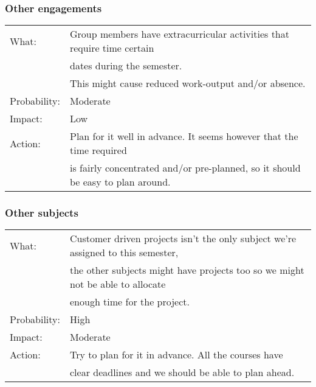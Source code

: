 \subsubsection{Other engagements}
\begin{tabular}{| l | l |}
	\hline
	What: & Group members have extracurricular activities that require time certain\\
	 & dates during the semester.\\
	 & This might cause reduced work-output and/or absence.\\
	\hline
	Probability: & Moderate \\
	\hline
	Impact: & Low \\
	\hline
	Action: & Plan for it well in advance. It seems however that the time required\\
	& is fairly concentrated and/or pre-planned, so it should be easy to plan around.\\
	\hline

\end{tabular}

\subsubsection{Other subjects}
\begin{tabular}{| l | l |}
	\hline
	What: & Customer driven projects isn't the only subject we're assigned to this semester,\\
	& the other subjects might have projects too so we might not be able to allocate\\
	& enough time for the project.\\
	\hline
	Probability: & High \\
	\hline
	Impact: & Moderate \\
	\hline
	Action: & Try to plan for it in advance. All the courses have\\
	 & clear deadlines and we should be able to plan ahead.\\
	\hline

\end{tabular}

